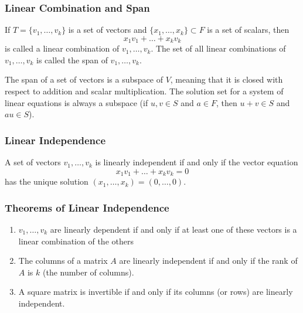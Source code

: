 \documentclass[xcolor=dvipsnames]{beamer}
\begin{document}
\begin{frame}
  \frametitle{Linear Combination and Span}
  If $T=\{v_{1},{\ldots},v_{k}\}$ is a set of vectors and
  $\{x_{1},{\ldots},x_{k}\}\subset{}F$ is a set of scalars, then
  \begin{equation}
    \label{eq:aiveatah}
    x_{1}v_{1}+{\ldots}+x_{k}v_{k}
  \end{equation}
  is called a \alert{linear combination} of $v_{1},{\ldots},v_{k}$.
  The set of all linear combinations of $v_{1},{\ldots},v_{k}$ is
  called the \alert{span} of $v_{1},{\ldots},v_{k}$.

  \medskip

  The span of a set of vectors is a \alert{subspace} of $V$, meaning
  that it is closed with respect to addition and scalar
  multiplication. The solution set for a system of linear equations is
  always a subspace (if $u,v\in{}S$ and $a\in{}F$, then $u+v\in{}S$
  and $au\in{}S$).
\end{frame}

\begin{frame}
  \frametitle{Linear Independence}
  A set of vectors $v_{1},{\ldots},v_{k}$ is \alert{linearly
    independent} if and only if the vector equation
  \begin{equation}
    \label{eq:wohsiete}
    x_{1}v_{1}+{\ldots}+x_{k}v_{k}=0    
  \end{equation}
  has the unique solution $(x_{1},{\ldots},x_{k})=(0,{\ldots},0)$.
\end{frame}

\begin{frame}
  \frametitle{Theorems of Linear Independence}
  \begin{enumerate}
  \item $v_{1},{\ldots},v_{k}$ are linearly dependent if and only if
    at least one of these vectors is a linear combination of the
    others
  \item The columns of a matrix $A$ are linearly independent if and
    only if the rank of $A$ is $k$ (the number of columns).
  \item A square matrix is invertible if and only if its columns (or
    rows) are linearly independent.
  \end{enumerate}
\end{frame}
\end{document}
